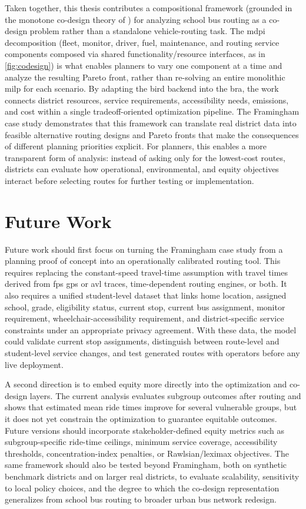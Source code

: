 Taken together, this thesis contributes a compositional framework (grounded in the monotone co-design theory of \textcite{censi2016Mathematical}) for analyzing school bus routing as a co-design problem rather than a standalone vehicle-routing task. The \gls{mdpi} decomposition (fleet, monitor, driver, fuel, maintenance, and routing service components composed via shared functionality/resource interfaces, as in \autoref{fig:codesign}) is what enables planners to vary one component at a time and analyze the resulting Pareto front, rather than re-solving an entire monolithic \gls{milp} for each scenario. By adapting the \gls{bird} backend into the \gls{bra}, the work connects district resources, service requirements, accessibility needs, emissions, and cost within a single tradeoff-oriented optimization pipeline. The Framingham case study demonstrates that this framework can translate real district data into feasible alternative routing designs and Pareto fronts that make the consequences of different planning priorities explicit. For planners, this enables a more transparent form of analysis: instead of asking only for the lowest-cost routes, districts can evaluate how operational, environmental, and equity objectives interact before selecting routes for further testing or implementation.

\section{Future Work}

Future work should first focus on turning the Framingham case study from a planning proof of concept into an operationally calibrated routing tool. This requires replacing the constant-speed travel-time assumption with travel times derived from \gls{fps} \gls{gps} or \gls{avl} traces, time-dependent routing engines, or both. It also requires a unified student-level dataset that links home location, assigned school, grade, eligibility status, current stop, current bus assignment, monitor requirement, wheelchair-accessibility requirement, and district-specific service constraints under an appropriate privacy agreement. With these data, the model could validate current stop assignments, distinguish between route-level and student-level service changes, and test generated routes with operators before any live deployment.

A second direction is to embed equity more directly into the optimization and co-design layers. The current analysis evaluates subgroup outcomes after routing and shows that estimated mean ride times improve for several vulnerable groups, but it does not yet constrain the optimization to guarantee equitable outcomes. Future versions should incorporate stakeholder-defined equity metrics such as subgroup-specific ride-time ceilings, minimum service coverage, accessibility thresholds, concentration-index penalties, or Rawlsian/leximax objectives. The same framework should also be tested beyond Framingham, both on synthetic benchmark districts and on larger real districts, to evaluate scalability, sensitivity to local policy choices, and the degree to which the co-design representation generalizes from school bus routing to broader urban bus network redesign.